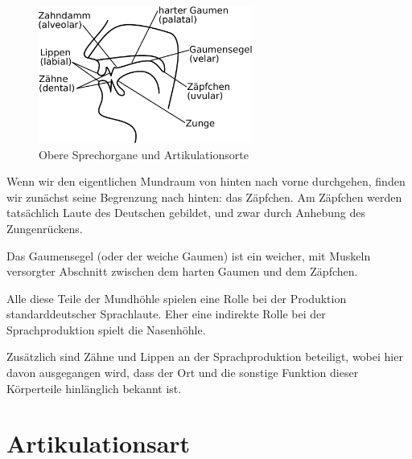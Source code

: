 \begin{figure}[!h]
  \centering
  \includegraphics[width=7cm]{figures/mundraum}
  \caption[Obere Sprechorgane und Artikulationsorte]{Obere Sprechorgane und Artikulationsorte}
  \label{fig:oberesprechorgane}
\end{figure}

Wenn wir den eigentlichen Mundraum von hinten nach vorne durchgehen, finden wir zunächst seine Begrenzung nach hinten: das Zäpfchen.
Am Zäpfchen werden tatsächlich Laute des Deutschen gebildet, und zwar durch Anhebung des Zungenrückens.

Das Gaumensegel (oder der weiche Gaumen) ist ein weicher, mit Muskeln versorgter Abschnitt zwischen dem harten Gaumen und dem Zäpfchen.


Alle diese Teile der Mundhöhle spielen eine Rolle bei der Produktion standarddeutscher Sprachlaute.
Eher eine indirekte Rolle bei der Sprachproduktion spielt die Nasenhöhle.


Zusätzlich sind Zähne und Lippen an der Sprachproduktion beteiligt, wobei hier davon ausgegangen wird, dass der Ort und die sonstige Funktion dieser Körperteile hinlänglich bekannt ist.

\section{Artikulationsart}

